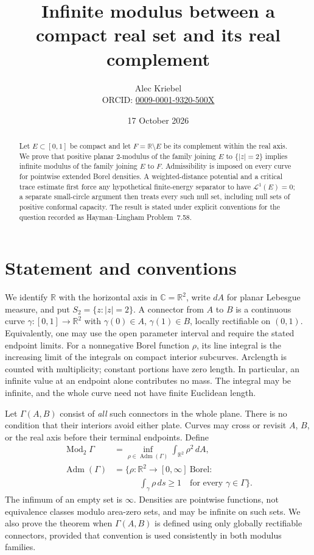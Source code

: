 \documentclass[11pt]{article}
\title{Infinite modulus between a compact real set and its real complement}
\author{Alec Kriebel\\
  \small ORCID: \href{https://orcid.org/0009-0001-9320-500X}{0009-0001-9320-500X}}
\date{17 October 2026}
\newcommand{\R}{\mathbb R}
\newcommand{\C}{\mathbb C}
\newcommand{\Mod}{\operatorname{Mod}_2}
\newcommand{\Adm}{\operatorname{Adm}}
\newcommand{\length}{\mathcal L^1}
\begin{document}
\maketitle

\begin{abstract}
Let $E\subset[0,1]$ be compact and let $F=\R\setminus E$ be its complement
within the real axis. We prove that positive planar $2$-modulus of the family
joining $E$ to $\{|z|=2\}$ implies infinite modulus of the family joining $E$
to $F$. Admissibility is imposed on every curve for pointwise extended Borel
densities. A weighted-distance potential and a critical trace estimate first
force any hypothetical finite-energy separator to have $\length(E)=0$; a
separate small-circle argument then treats every such null set, including
null sets of positive conformal capacity. The result is stated under explicit
conventions for the question recorded as Hayman--Lingham Problem~7.58.
\end{abstract}

\section{Statement and conventions}

We identify $\R$ with the horizontal axis in $\C=\R^2$, write $dA$ for
planar Lebesgue measure, and put $S_2=\{z:|z|=2\}$. A connector from $A$ to
$B$ is a continuous curve $\gamma:[0,1]\to\R^2$ with
$\gamma(0)\in A$, $\gamma(1)\in B$, locally rectifiable on $(0,1)$.
Equivalently, one may use the open parameter interval and require the stated
endpoint limits. For a nonnegative Borel function $\rho$, its line integral
is the increasing limit of the integrals on compact interior subcurves.
Arclength is counted with multiplicity; constant portions have zero length.
In particular, an infinite value at an endpoint alone contributes no mass.
The integral may be infinite, and the whole curve need not have finite
Euclidean length.

Let $\Gamma(A,B)$ consist of \emph{all} such connectors in the whole plane.
There is no condition that their interiors avoid either plate. Curves may
cross or revisit $A$, $B$, or the real axis before their terminal endpoints.
Define
\[
 \begin{split}
 \Mod\Gamma&=\inf_{\rho\in\Adm(\Gamma)}\int_{\R^2}\rho^2\,dA,\\
 \Adm(\Gamma)&=\bigl\{\rho:\R^2\to[0,\infty]\ \text{Borel}:\\
 &\hspace{3em}\int_\gamma\rho\,ds\geq1\quad\text{for every }\gamma\in\Gamma\bigr\}.
 \end{split}
\]
The infimum of an empty set is $\infty$. Densities are pointwise functions,
not equivalence classes modulo area-zero sets, and may be infinite on such
sets. We also prove the theorem when $\Gamma(A,B)$ is defined using only
globally rectifiable connectors, provided that convention is used
consistently in both modulus families.
\end{document}
